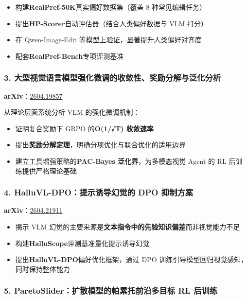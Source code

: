 \begin{itemize}[leftmargin=1.5em]
  \item 构建\textbf{RealPref-50K}真实偏好数据集（覆盖 8 种常见编辑任务）
  \item 提出\textbf{HP-Scorer}自动评估器（结合人类偏好数据与 VLM 打分）
  \item 在 Qwen-Image-Edit 等模型上验证，显著提升人类偏好对齐度
  \item 配套\textbf{RealPref-Bench}专项评测基准
\end{itemize}

\subsubsection{3. 大型视觉语言模型强化微调的收敛性、奖励分解与泛化分析}

\textbf{arXiv}：\href{https://arxiv.org/abs/2604.19857}{2604.19857}

从理论层面系统分析 VLM 的强化微调机制：

\begin{itemize}[leftmargin=1.5em]
  \item 证明复合奖励下 GRPO 的\textbf{O(1/√T) 收敛速率}
  \item 提出\textbf{奖励分解定理}，明确分项优化与联合优化的适用边界
  \item 建立工具增强策略的\textbf{PAC-Bayes 泛化界}，为多模态视觉 Agent 的 RL 后训练提供严格理论基础
\end{itemize}

\subsubsection{4. HalluVL-DPO：提示诱导幻觉的 DPO 抑制方案}

\textbf{arXiv}：\href{https://arxiv.org/abs/2604.21911}{2604.21911}

\begin{itemize}[leftmargin=1.5em]
  \item 揭示 VLM 幻觉的主要来源是\textbf{文本指令中的先验知识偏差}而非视觉能力不足
  \item 构建\textbf{HalluScope}评测基准量化提示诱导幻觉
  \item 提出\textbf{HalluVL-DPO}偏好优化框架，通过 DPO 训练引导模型回归视觉感知，同时保持整体能力
\end{itemize}

\subsubsection{5. ParetoSlider：扩散模型的帕累托前沿多目标 RL 后训练}

